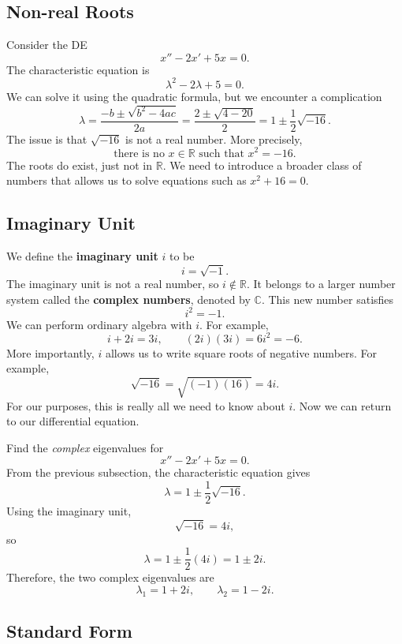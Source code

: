 \documentclass[10pt,letterpaper]{article}
\begin{document}
\subsection{Non-real Roots}

Consider the DE
\[
x''-2x'+5x=0.
\]
The characteristic equation is
\[
\lambda^2-2\lambda+5=0.
\]
We can solve it using the quadratic formula, but we encounter a complication
\[
\lambda
=\frac{-b\pm\sqrt{b^2-4ac}}{2a}
=\frac{2\pm\sqrt{4-20}}{2}
=1\pm\frac{1}{2}\sqrt{-16}.
\]
The issue is that $\sqrt{-16}$ is not a real number. More precisely,
\[
\text{there is no $x\in\mathbb{R}$ such that }x^2=-16.
\]
The roots do exist, just not in $\mathbb{R}$. We need to introduce a broader class of numbers that allows us to solve equations such as $x^2+16=0$.


\subsection{Imaginary Unit}

We define the \textbf{imaginary unit} $i$ to be
\[
i=\sqrt{-1}.
\]
The imaginary unit is not a real number, so $i\notin\mathbb{R}$.
It belongs to a larger number system called the \textbf{complex numbers},
denoted by $\mathbb{C}$. This new number satisfies
\[
i^2=-1.
\]
We can perform ordinary algebra with $i$. For example,
\[
i+2i=3i,
\qquad
(2i)(3i)=6i^2=-6.
\]
More importantly, $i$ allows us to write square roots of negative
numbers. For example,
\[
\sqrt{-16}=\sqrt{(-1)(16)}=4i.
\]
For our purposes, this is really all we need to know about $i$.
Now we can return to our differential equation.


\begin{example}[4]
{
Find the \textit{complex} eigenvalues for
\[
x''-2x'+5x=0.
\]
}
From the previous subsection, the characteristic equation gives
\[
\lambda
=1\pm\frac{1}{2}\sqrt{-16}.
\]
Using the imaginary unit,
\[
\sqrt{-16}=4i,
\]
so
\[
\lambda
=1\pm\frac{1}{2}(4i)
=1\pm2i.
\]
Therefore, the two complex eigenvalues are
\[
\boxed{\lambda_1=1+2i,
\qquad
\lambda_2=1-2i.}
\]

\end{example}


\subsection{Standard Form}
\end{document}
